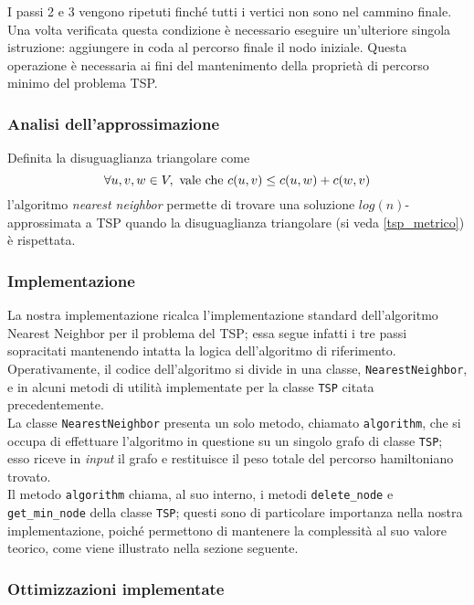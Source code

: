 I passi 2 e 3 vengono ripetuti finché tutti i vertici non sono nel cammino finale. Una volta verificata questa condizione è necessario eseguire un'ulteriore singola istruzione: aggiungere in coda al percorso finale il nodo iniziale. Questa operazione è necessaria ai fini del mantenimento della proprietà di percorso minimo del problema TSP. \\

\subsubsection{Analisi dell'approssimazione}

Definita la disuguaglianza triangolare come
\begin{equation}
    \forall u, v, w \in V, \textnormal{ vale che } c(u, v) \le c(u, w) + c(w, v)
\end{equation}
l'algoritmo \textit{nearest neighbor} permette di trovare una soluzione $log(n)$-approssimata a TSP quando la disuguaglianza triangolare (si veda \ref{tsp_metrico}) è rispettata.

\subsubsection{Implementazione}

La nostra implementazione ricalca l'implementazione standard dell'algoritmo Nearest Neighbor per il problema del TSP; essa segue infatti i tre passi sopracitati mantenendo intatta la logica dell'algoritmo di riferimento. \\
Operativamente, il codice dell'algoritmo si divide in una classe, \texttt{NearestNeighbor}, e in alcuni metodi di utilità implementate per la classe \texttt{TSP} citata precedentemente. \\
La classe \texttt{NearestNeighbor} presenta un solo metodo, chiamato \texttt{algorithm}, che si occupa di effettuare l'algoritmo in questione su un singolo grafo di classe \texttt{TSP}; esso riceve in \textit{input} il grafo e restituisce il peso totale del percorso hamiltoniano trovato. \\
Il metodo \texttt{algorithm} chiama, al suo interno, i metodi \texttt{delete\_node} e \texttt{get\_min\_node} della classe \texttt{TSP}; questi sono di particolare importanza nella nostra implementazione, poiché permettono di mantenere la complessità al suo valore teorico, come viene illustrato nella sezione seguente.

\subsubsection{Ottimizzazioni implementate}

